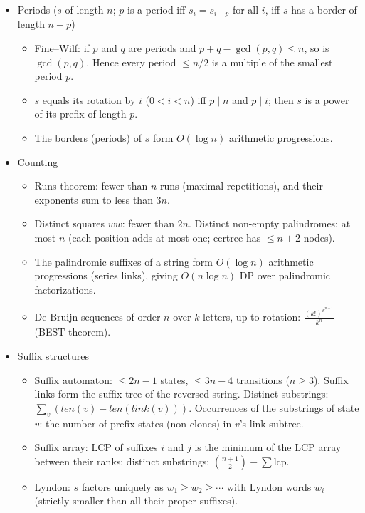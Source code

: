 \begin{itemize}
\item Periods ($s$ of length $n$; $p$ is a period iff $s_i = s_{i+p}$ for all $i$, iff $s$ has a border of length $n - p$)
\begin{itemize}
  \item Fine–Wilf: if $p$ and $q$ are periods and $p + q - \gcd(p, q) \le n$, so is $\gcd(p, q)$. Hence every period $\le n/2$ is a multiple of the smallest period $p$.
  \item $s$ equals its rotation by $i$ ($0 < i < n$) iff $p \mid n$ and $p \mid i$; then $s$ is a power of its prefix of length $p$.
  \item The borders (periods) of $s$ form $O(\log n)$ arithmetic progressions.
\end{itemize}

\item Counting
\begin{itemize}
  \item Runs theorem: fewer than $n$ runs (maximal repetitions), and their exponents sum to less than $3n$.
  \item Distinct squares $ww$: fewer than $2n$. Distinct non-empty palindromes: at most $n$ (each position adds at most one; eertree has $\le n + 2$ nodes).
  \item The palindromic suffixes of a string form $O(\log n)$ arithmetic progressions (series links), giving $O(n \log n)$ DP over palindromic factorizations.
  \item De Bruijn sequences of order $n$ over $k$ letters, up to rotation: $\frac{(k!)^{k^{n-1}}}{k^n}$ (BEST theorem).
\end{itemize}

\item Suffix structures
\begin{itemize}
  \item Suffix automaton: $\le 2n - 1$ states, $\le 3n - 4$ transitions ($n \ge 3$). Suffix links form the suffix tree of the reversed string. Distinct substrings: $\sum_v (len(v) - len(link(v)))$. Occurrences of the substrings of state $v$: the number of prefix states (non-clones) in $v$'s link subtree.
  \item Suffix array: $\mathrm{LCP}$ of suffixes $i$ and $j$ is the minimum of the LCP array between their ranks; distinct substrings: $\binom{n+1}{2} - \sum \mathrm{lcp}$.
  \item Lyndon: $s$ factors uniquely as $w_1 \ge w_2 \ge \cdots$ with Lyndon words $w_i$ (strictly smaller than all their proper suffixes).
\end{itemize}


\end{itemize}
